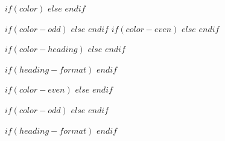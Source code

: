 
$if(color)$
$else$
$endif$


$if(color-odd)$
$else$ 
$endif$
$if(color-even)$
$else$
$endif$

\renewcommand*{\arraystretch}{2}

$if(color-heading)$
$else$
$endif$

$if(heading-format)$
$endif$

$if(color-even)$
$else$
$endif$

$if(color-odd)$
$else$
$endif$



$if(heading-format)$
\renewcommand*{\sectionformat}{%
    \usekomafont{section}%
    \fboxrule=1pt\fcolorbox{HeadingColor}{HeadingColor!30}{\thesection}%
    \color{HeadingColor}\rule[.5ex]{10pt}{1pt}\>%
}
$endif$
